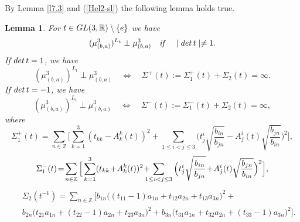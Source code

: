 \documentclass[preprint,12pt]{elsarticle}
\newtheorem{lem}[thm]{Lemma}
\numberwithin{equation}{section}
\begin{document}
%
By Lemma \ref{l7.3}
and (\ref{Hel2-sl}) the following lemma holds true.
\begin{lem}
\label{l.mu^3(b,a)^t-perp}
 For $t\in {\rm GL}(3,{\mathbb R})\setminus\{e\}$ we have
\begin{equation*}
 (\mu_{(b,a)}^3)^{L_t}\perp\mu_{(b,a)}^3\quad{\it
if}\quad\mid{\rm det}\,t\mid\not=1.
\end{equation*}
If ${\rm det}\,t=1$, we have
$$
(\mu_{(b,a)}^3)^{L_t}\perp\mu_{(b,a)}^3\quad\Leftrightarrow\quad\Sigma^+(t):=\Sigma_1^+(t)+
\Sigma_2(t)=\infty.
$$
If ${\rm det}\,t=-1$, we have
$$
(\mu_{(b,a)}^3)^{L_t}\perp\mu_{(b,a)}^3\quad\Leftrightarrow\quad\Sigma^{-}(t):=\Sigma_1^{-}(t)+
\Sigma_2(t)=\infty,
$$ 
%
where  
\begin{equation}
\label{Sigma_1^+(t)} 
\Sigma_1^+(t)\!=\!\sum_{n\in{\mathbb
Z}}\Big[
\sum_{k=1}^3(t_{kk}\!-\!A_k^k(t))^2\!+\!\!\!\!
 \sum_{1\leq i<j\leq 3}\Big(t^i_j\sqrt{\frac{b_{in}}{b_{jn}}}\! -\!A^i_j(t)\sqrt{\frac{b_{jn}}{b_{in}}}\Big)^2
\Big],
\end{equation}
\begin{equation} 
\label{Sigma_1^{-}(t)}
\Sigma_1^{-}(t)\!=\!\sum_{n\in{\mathbb
Z}}\Big[
\sum_{k=1}^3(t_{kk}\!+\!A_k^k(t))^2\!+\!\!\!\!\!
 \sum_{1\leq i<j\leq 3}\Big(t^i_j\sqrt{\frac{b_{in}}{b_{jn}}}\!+\!A^i_j(t)\sqrt{\frac{b_{jn}}{b_{in}}}\Big)^2
\Big],
\end{equation}
% 
\begin{eqnarray}
\label{Sigma_3}
&&\Sigma_2(t^{-1})=\sum_{n\in{\mathbb
Z}}\Big[b_{1n}\big((t_{11}-1)a_{1n}+t_{12}a_{2n}+t_{13}a_{3n}\big)^2+\\
\nonumber
&&
b_{2n}\big(t_{21}a_{1n}+(t_{22}\!-\!1)a_{2n}+t_{23}a_{3n}\big)^2
+b_{3n}\big(t_{31}a_{1n}+t_{32}a_{2n}+(t_{33}\!-\!1)a_{3n}\big)^2\Big].
\end{eqnarray}
\end{lem}
\end{document}
